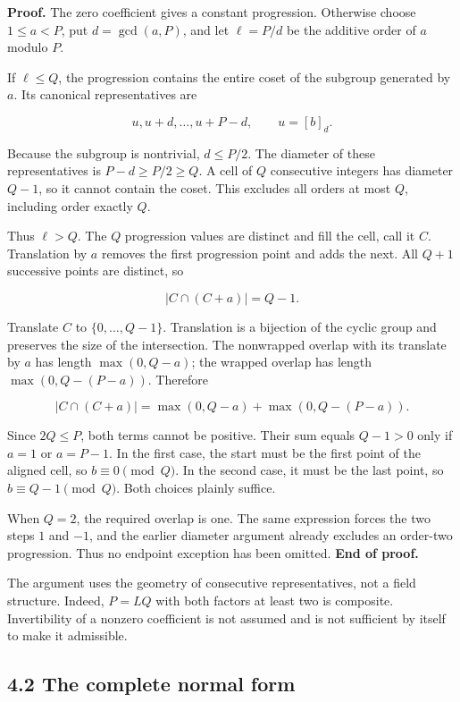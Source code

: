 \documentclass[
]{article}
\begin{document}
\textbf{Proof.} The zero coefficient gives a constant progression.
Otherwise choose \(1\le a<P\), put \(d=\gcd(a,P)\), and let \(\ell=P/d\)
be the additive order of \(a\) modulo \(P\).

If \(\ell\le Q\), the progression contains the entire coset of the
subgroup generated by \(a\). Its canonical representatives are

\[
u,u+d,\ldots,u+P-d,\qquad u=[b]_d.
\]

Because the subgroup is nontrivial, \(d\le P/2\). The diameter of these
representatives is \(P-d\ge P/2\ge Q\). A cell of \(Q\) consecutive
integers has diameter \(Q-1\), so it cannot contain the coset. This
excludes all orders at most \(Q\), including order exactly \(Q\).

Thus \(\ell>Q\). The \(Q\) progression values are distinct and fill the
cell, call it \(C\). Translation by \(a\) removes the first progression
point and adds the next. All \(Q+1\) successive points are distinct, so

\[
|C\cap(C+a)|=Q-1.
\]

Translate \(C\) to \(\{0,\ldots,Q-1\}\). Translation is a bijection of
the cyclic group and preserves the size of the intersection. The
nonwrapped overlap with its translate by \(a\) has length
\(\max(0,Q-a)\); the wrapped overlap has length \(\max(0,Q-(P-a))\).
Therefore

\[
|C\cap(C+a)|=\max(0,Q-a)+\max(0,Q-(P-a)).
\]

Since \(2Q\le P\), both terms cannot be positive. Their sum equals
\(Q-1>0\) only if \(a=1\) or \(a=P-1\). In the first case, the start
must be the first point of the aligned cell, so \(b\equiv0\pmod Q\). In
the second case, it must be the last point, so \(b\equiv Q-1\pmod Q\).
Both choices plainly suffice.

When \(Q=2\), the required overlap is one. The same expression forces
the two steps \(1\) and \(-1\), and the earlier diameter argument
already excludes an order-two progression. Thus no endpoint exception
has been omitted. \textbf{End of proof.}

The argument uses the geometry of consecutive representatives, not a
field structure. Indeed, \(P=LQ\) with both factors at least two is
composite. Invertibility of a nonzero coefficient is not assumed and is
not sufficient by itself to make it admissible.

\subsection{4.2 The complete normal
form}\label{the-complete-normal-form}
\end{document}

